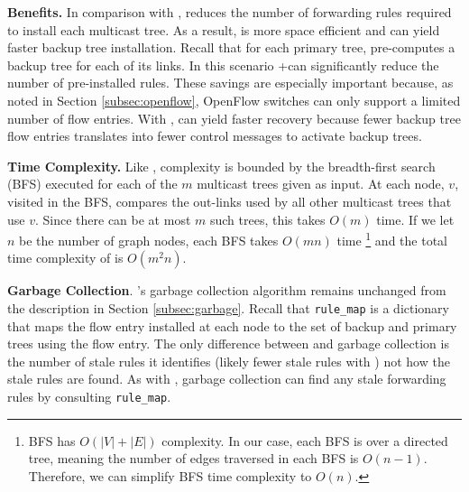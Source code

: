 {\bf Benefits.}
In comparison with \bases, \merge reduces the number of forwarding rules required to install each multicast tree.  As a result,
\merge is more space efficient and can yield faster backup tree installation.
Recall that for each primary tree, \mdr pre-computes a backup tree for each of its links.  In this scenario \pres+\merge can significantly reduce the number of pre-installed rules.
These savings are especially important because, as noted in Section \ref{subsec:openflow}, OpenFlow switches can only support a limited number of flow entries.
With \posts, \merge can yield faster recovery because fewer backup tree flow entries translates into fewer control messages to activate backup trees.

{\bf Time Complexity.}
Like \bases, \merge complexity is bounded by the breadth-first search (BFS) executed for each of the $m$ multicast trees given as input.  At each node, $v$, visited in the BFS, \merge
compares the out-links used by all other multicast trees that use $v$.  Since there can be at most $m$ such trees, this takes $O(m)$ time.  If we let $n$ be the number of graph nodes,
each BFS takes $O(mn)$ time \footnote{BFS has $O(|V|+|E|)$ complexity. In our case, each BFS is over a directed tree, meaning the number of edges traversed in each BFS is $O(n-1)$.  
Therefore, we can simplify BFS time complexity to $O(n)$.}
and the total time complexity of \merge is $O(m^2n)$.


{\bf Garbage Collection}.
\mdrs's garbage collection algorithm remains unchanged from the description in Section \ref{subsec:garbage}.  
Recall that {\tt rule\_map} is a dictionary that maps the flow entry installed at each node to the
set of backup and primary trees using the flow entry. The only difference between \base and \merge garbage collection is the number of stale rules it identifies (likely fewer
stale rules with \merges) not how the stale rules are found.  
As with \bases, \merge garbage collection can find any stale forwarding rules by consulting {\tt rule\_map}.


